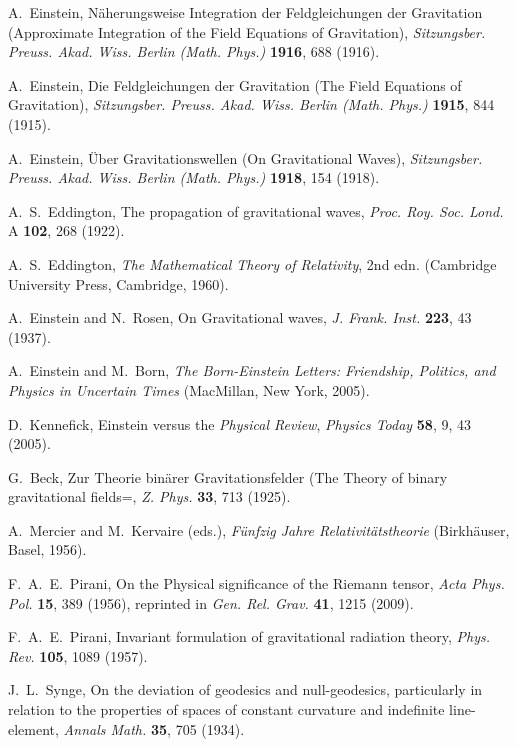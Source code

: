 \documentclass{ws-procs961x669}            %
\begin{document}
\begin{thebibliography}{99}
A.~Einstein,  N\"{a}herungsweise Integration der Feldgleichungen
der Gravitation (Approximate Integration of the Field Equations of
Gravitation), {\it Sitzungsber. Preuss. Akad. Wiss. Berlin (Math.
Phys.)} \textbf{1916}, 688 (1916).

A.~Einstein, Die Feldgleichungen der Gravitation (The Field
Equations of Gravitation), {\it Sitzungsber. Preuss. Akad. Wiss.
Berlin (Math. Phys.)} \textbf{1915}, 844 (1915).

A.~Einstein, \"{U}ber Gravitationswellen (On Gravitational Waves),
{\it Sitzungsber. Preuss. Akad. Wiss. Berlin (Math. Phys.)}
\textbf{1918}, 154 (1918).

A.~S.~Eddington, The propagation of gravitational waves, {\it
Proc. Roy. Soc. Lond.} A \textbf{102}, 268 (1922).

A.~S.~Eddington, {\it The Mathematical Theory of Relativity}, 2nd
edn. (Cambridge University Press, Cambridge, 1960).

A.~Einstein and N.~Rosen, On Gravitational waves, {\it J. Frank.
Inst.} {\bf 223}, 43 (1937).

A.~Einstein and M.~Born, {\it The Born-Einstein Letters:
Friendship, Politics, and Physics in Uncertain Times} (MacMillan,
New York, 2005).

D.~Kennefick, Einstein versus the \emph{Physical Review}, {\em
Physics Today} {\bf 58}, 9, 43 (2005).

G.~Beck, Zur Theorie bin\"{a}rer Gravitationsfelder (The Theory of
binary gravitational fields=, {\em Z. Phys.} {\bf 33}, 713 (1925).

A.~Mercier and M.~Kervaire (eds.), {\it F\"{u}nfzig Jahre
Relativit\"{a}tstheorie} (Birkh\"{a}user, Basel, 1956).

F.~A.~E.~Pirani, On the Physical significance of the Riemann
tensor, {\em Acta Phys. Pol.} {\bf 15}, 389 (1956), reprinted in
{\em Gen. Rel. Grav.} {\bf 41}, 1215 (2009).

F.~A.~E.~Pirani, Invariant formulation of gravitational radiation
theory, {\em Phys. Rev.}  {\bf 105}, 1089 (1957).

J.~L.~Synge, On the deviation of geodesics and null-geodesics,
particularly in relation to the properties of spaces of constant
curvature and indefinite line-element, {\em Annals Math.} {\bf
35}, 705 (1934).


\end{thebibliography}
\end{document}
